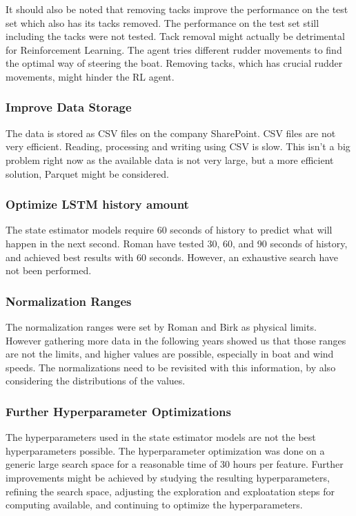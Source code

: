 \documentclass[12pt,twoside]{report}
\begin{document}
It should also be noted that removing tacks improve the performance on the test set which also has its tacks removed. The performance on the test set still including the tacks were not tested. Tack removal might actually be detrimental for Reinforcement Learning. The agent tries different rudder movements to find the optimal way of steering the boat. Removing tacks, which has crucial rudder movements, might hinder the RL agent.

\subsubsection{Improve Data Storage}
The data is stored as CSV files on the company SharePoint. CSV files are not very efficient. Reading, processing and writing using CSV is slow. This isn't a big problem right now as the available data is not very large, but a more efficient solution, Parquet \cite{parquet} might be considered.

\subsubsection{Optimize LSTM history amount}
The state estimator models require 60 seconds of history to predict what will happen in the next second. Roman \cite{roman} have tested 30, 60, and 90 seconds of history, and achieved best results with 60 seconds. However, an exhaustive search have not been performed.

\subsubsection{Normalization Ranges}
The normalization ranges were set by Roman \cite{roman} and Birk \cite{birk} as physical limits. However gathering more data in the following years showed us that those ranges are not the limits, and higher values are possible, especially in boat and wind speeds. The normalizations need to be revisited with this information, by also considering the distributions of the values.

\subsubsection{Further Hyperparameter Optimizations}
The hyperparameters used in the state estimator models are not the best hyperparameters possible. The hyperparameter optimization was done on a generic large search space for a reasonable time of 30 hours per feature. Further improvements might be achieved by studying the resulting hyperparameters, refining the search space, adjusting the exploration and exploatation steps for computing available, and continuing to optimize the hyperparameters.
\end{document}
